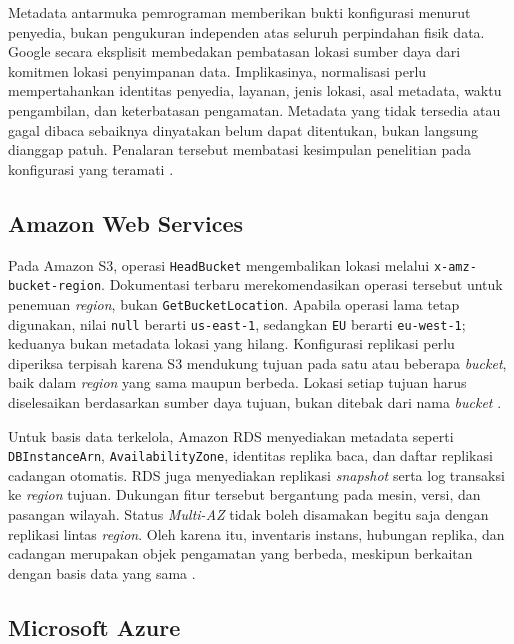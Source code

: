 Metadata antarmuka pemrograman memberikan bukti konfigurasi menurut penyedia, bukan pengukuran independen atas seluruh perpindahan fisik data. Google secara eksplisit membedakan pembatasan lokasi sumber daya dari komitmen lokasi penyimpanan data. Implikasinya, normalisasi perlu mempertahankan identitas penyedia, layanan, jenis lokasi, asal metadata, waktu pengambilan, dan keterbatasan pengamatan. Metadata yang tidak tersedia atau gagal dibaca sebaiknya dinyatakan belum dapat ditentukan, bukan langsung dianggap patuh. Penalaran tersebut membatasi kesimpulan penelitian pada konfigurasi yang teramati \autocite{b2c_gcpLocationConstraint}.

\subsection{Amazon Web Services}

Pada Amazon S3, operasi \texttt{HeadBucket} mengembalikan lokasi melalui \texttt{x-amz-\allowbreak bucket-\allowbreak region}. Dokumentasi terbaru merekomendasikan operasi tersebut untuk penemuan \textit{region}, bukan \texttt{GetBucketLocation}. Apabila operasi lama tetap digunakan, nilai \texttt{null} berarti \texttt{us-east-1}, sedangkan \texttt{EU} berarti \texttt{eu-west-1}; keduanya bukan metadata lokasi yang hilang. Konfigurasi replikasi perlu diperiksa terpisah karena S3 mendukung tujuan pada satu atau beberapa \textit{bucket}, baik dalam \textit{region} yang sama maupun berbeda. Lokasi setiap tujuan harus diselesaikan berdasarkan sumber daya tujuan, bukan ditebak dari nama \textit{bucket} \autocite{b2c_awsHeadBucket,b2c_awsS3Location,b2c_awsS3Replication}.

Untuk basis data terkelola, Amazon RDS menyediakan metadata seperti \texttt{DB\allowbreak InstanceArn}, \texttt{AvailabilityZone}, identitas replika baca, dan daftar replikasi cadangan otomatis. RDS juga menyediakan replikasi \textit{snapshot} serta log transaksi ke \textit{region} tujuan. Dukungan fitur tersebut bergantung pada mesin, versi, dan pasangan wilayah. Status \textit{Multi-AZ} tidak boleh disamakan begitu saja dengan replikasi lintas \textit{region}. Oleh karena itu, inventaris instans, hubungan replika, dan cadangan merupakan objek pengamatan yang berbeda, meskipun berkaitan dengan basis data yang sama \autocite{b2c_awsRdsMetadata,b2c_awsRdsBackupReplication}.

\subsection{Microsoft Azure}

